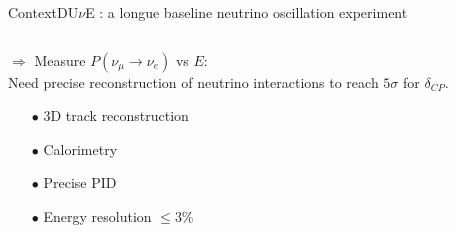 \documentclass[10pt]{beamer}
\begin{document}
\begin{frame}{Context}{DU$\nu$E : a longue baseline neutrino oscillation experiment}
\begin{columns}
\begin{column}{0.4\textwidth}
\begin{scriptsize}
	    			$\Rightarrow$ Measure $P(\nu_{\mu}\to\nu_e)$ vs $E$: \\
	    			Need precise reconstruction of neutrino interactions to reach $5\sigma$ for $\delta_{CP}$.
    			\end{scriptsize}
    			\begin{itemize}
    				\item[$\bullet$] 3D track reconstruction
    				\item[$\bullet$] Calorimetry
    				\item[$\bullet$] Precise PID
    				\item[$\bullet$] Energy resolution $\leq$3\%
    			\end{itemize}
    		\end{column}
    	\end{columns}
    \end{frame}
    
\end{document}
